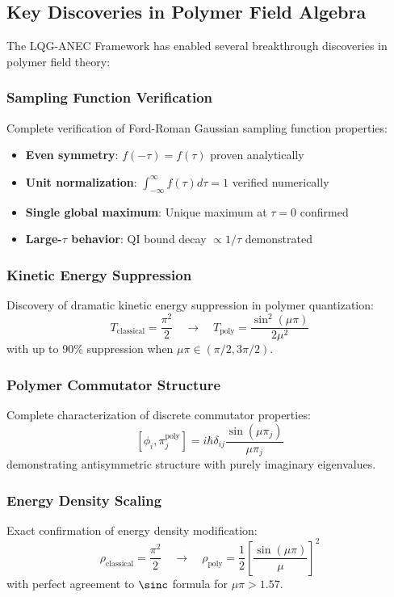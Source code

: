 \documentclass[11pt]{article}
\begin{document}
\subsection{Key Discoveries in Polymer Field Algebra}

The LQG-ANEC Framework has enabled several breakthrough discoveries in polymer field theory:

\subsubsection{Sampling Function Verification}
Complete verification of Ford-Roman Gaussian sampling function properties:
\begin{itemize}
\item \textbf{Even symmetry}: $f(-\tau) = f(\tau)$ proven analytically
\item \textbf{Unit normalization}: $\int_{-\infty}^{\infty} f(\tau) d\tau = 1$ verified numerically
\item \textbf{Single global maximum}: Unique maximum at $\tau = 0$ confirmed
\item \textbf{Large-$\tau$ behavior}: QI bound decay $\propto 1/\tau$ demonstrated
\end{itemize}

\subsubsection{Kinetic Energy Suppression}
Discovery of dramatic kinetic energy suppression in polymer quantization:
\[
T_{\text{classical}} = \frac{\pi^2}{2} \quad \rightarrow \quad T_{\text{poly}} = \frac{\sin^2(\mu\pi)}{2\mu^2}
\]
with up to 90\% suppression when $\mu\pi \in (\pi/2, 3\pi/2)$.

\subsubsection{Polymer Commutator Structure}
Complete characterization of discrete commutator properties:
\[
[\phi_i, \pi_j^{\text{poly}}] = i\hbar \delta_{ij} \frac{\sin(\mu\pi_j)}{\mu\pi_j}
\]
demonstrating antisymmetric structure with purely imaginary eigenvalues.

\subsubsection{Energy Density Scaling}
Exact confirmation of energy density modification:
\[
\rho_{\text{classical}} = \frac{\pi^2}{2} \quad \rightarrow \quad \rho_{\text{poly}} = \frac{1}{2}\left[\frac{\sin(\mu\pi)}{\mu}\right]^2
\]
with perfect agreement to $\sinc$ formula for $\mu\pi > 1.57$.
\end{document}
